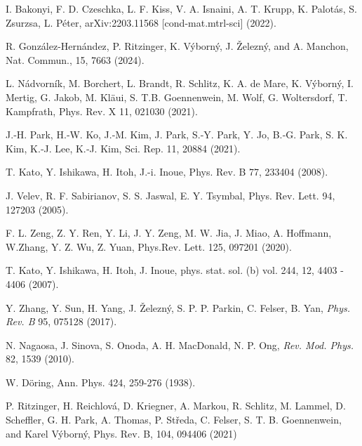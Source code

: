 \documentclass[prb,showpacs,amsmath,amssymb,superscriptaddress,twocolumn,floatfix]{revtex4-1}
\begin{document}
\begin{thebibliography}{99}
 I. Bakonyi, F. D. Czeschka, L. F. Kiss, V. A. Isnaini, A. T. Krupp, K. Palot\'as, S. Zsurzsa, L. P\'eter, arXiv:2203.11568 [cond-mat.mtrl-sci] (2022). %

 R. Gonz\'alez-Hern\'andez, P. Ritzinger, K. V\'yborn\'y, J. \v{Z}elezn\'y, and A. Manchon, Nat. Commun., 15, 7663 (2024).%

 L. N\'{a}dvorn\'{i}k, M. Borchert, L. Brandt, R. Schlitz, K. A. de Mare, K. V\'{y}born\'{y}, I. Mertig, G. Jakob, M. {Kl\"{a}ui}, S. T.B. Goennenwein, M. Wolf, G. Woltersdorf, T. Kampfrath, Phys. Rev. X 11, 021030 (2021). %

 J.‑H. Park, H.‑W. Ko, J.‑M. Kim, J. Park, S.‑Y. Park, Y. Jo, B.‑G. Park, S. K. Kim, K.‑J. Lee, K.‑J. Kim, Sci. Rep. 11, 20884 (2021).%


 T. Kato, Y. Ishikawa, H. Itoh, J.-i. Inoue, Phys. Rev. B 77, 233404 (2008). %

 J. Velev, R. F. Sabirianov, S. S. Jaswal, E. Y. Tsymbal, Phys. Rev. Lett. 94, 127203 (2005). %

 F. L. Zeng, Z. Y. Ren, Y. Li, J. Y. Zeng, M. W. Jia, J. Miao, A. Hoffmann, W.Zhang, Y. Z. Wu, Z. Yuan, Phys.Rev. Lett. 125, 097201 (2020). %

 T. Kato, Y. Ishikawa, H. Itoh, J. Inoue, phys. stat. sol. (b) vol. 244, 12, 4403 - 4406 (2007). %

 Y. Zhang, Y. Sun, H. Yang, J. \v{Z}elezn\'y, S. P. P. Parkin, C. Felser, B. Yan, \textit{Phys. Rev. B} 95, 075128 (2017). %

 N. Nagaosa, J. Sinova, S. Onoda, A. H. MacDonald, N. P. Ong, \textit{Rev. Mod. Phys.} 82, 1539 (2010). %


 W. D\"oring, Ann. Phys. 424, 259-276
(1938). %

  
 P. Ritzinger, H. Reichlov\'a, D. Kriegner, A. Markou, R. Schlitz, M. Lammel, D. Scheffler, G. H. Park, A. Thomas, P. St\v{r}eda, C. Felser, S. T. B. Goennenwein, and Karel V\'yborn\'y, Phys. Rev. B, 104, 094406 (2021)


\end{thebibliography}
\end{document}

